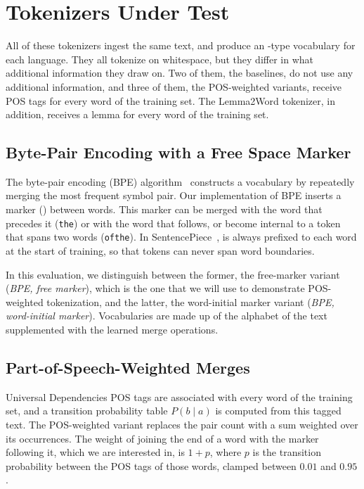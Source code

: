 \section{Tokenizers Under Test}\label{sec:methods}

All of these tokenizers ingest the same text, and produce an \nVocabBudget-type vocabulary for each language.
They all tokenize on whitespace, but they differ in what additional information they draw on.
Two of them, the baselines, do not use any additional information, and three of them, the POS-weighted variants, receive POS tags for every word of the training set.
The Lemma2Word tokenizer, in addition, receives a lemma for every word of the training set.

\subsection{Byte-Pair Encoding with a Free Space Marker}\label{sec:freebpe}
The byte-pair encoding (BPE) algorithm~\cite{sennrich2016bpe} constructs a vocabulary by repeatedly merging the most frequent symbol pair.
Our implementation of BPE inserts a marker (\textvisiblespace) between words.
This marker can be merged with the word that precedes it (\texttt{the\textvisiblespace}) or with the word that follows, or become internal to a token that spans two words (\texttt{of\textvisiblespace the\textvisiblespace}).
In SentencePiece~\cite{kudo2018sentencepiece}, \textvisiblespace{} is always prefixed to each word at the start of training, so that tokens can never span word boundaries.

In this evaluation, we distinguish between the former, the free-marker variant (\emph{BPE, free marker}), which is the one that we will use to demonstrate POS-weighted tokenization, and the latter, the word-initial marker variant (\emph{BPE, word-initial marker}).
Vocabularies are made up of the alphabet of the text supplemented with the learned merge operations.

\subsection{Part-of-Speech-Weighted Merges}\label{sec:posbpe}
Universal Dependencies POS tags are associated with every word of the training set, and a transition probability table $P(b \mid a)$ is computed from this tagged text.
The POS-weighted variant replaces the pair count with a sum weighted over its occurrences.
The weight of joining the end of a word with the marker following it, which we are interested in, is $1 + p$, where $p$ is the transition probability between the POS tags of those words, clamped between $0.01$ and $0.95$.

